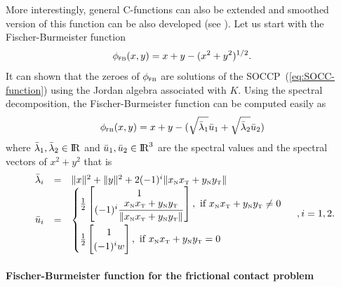 More interestingly,  general C-functions can also be extended and smoothed version of this function can be also developed (see \cite{Fukushima.ea2001}
). Let us start with the Fischer-Burmeister function
\begin{equation}
  \label{eq:Jordan-FB}
  \phi_{\fb}(x,y) = x+y - (x^2 + y^2 )^{1/2}.
\end{equation}
It can shown that the zeroes of $\phi_{{\hbox{\tiny{\textsf FB}}}}$ are solutions of the SOCCP~(\ref{eq:SOCC-function}) using the Jordan algebra associated with $K$. Using the spectral decomposition, the Fischer-Burmeister function can be computed easily as
\begin{equation}
  \label{eq:Jordan-FB-1}
  \phi_{\fb}(x,y) = x+y - (\sqrt{\bar \lambda_1} \bar u_1 + \sqrt{\bar \lambda_2} \bar u_2)
\end{equation}
where $\bar\lambda_1,\bar\lambda_2\in \mathrm{I\!R}$ and $\bar u_1,\bar u_2\in\mathrm{I\!R}^3$ are the spectral values and the spectral vectors of $x^2+y^2$ that is
\begin{equation}
  \label{eq:Jordan-FB-2}
  \begin{array}{rcl}
    \bar \lambda_i&=& \|x\|^2  + \|y\|^2 +   2 (-1)^i\|x_{\n}x_{\t} +y_{\n}y_{\t}\| \\
    \bar u_i &=&
    \begin{cases}
      \frac{1}{2}
      \begin{bmatrix}
        1 \\
        (-1)^i \Frac{x_{\n}x_{\t} +y_{\n}y_{\t}}{\|x_{\n}x_{\t} +y_{\n}y_{\t}\|}
      \end{bmatrix}, \text{ if } x_{\n}x_{\t} +y_{\n}y_{\t}\neq 0 \\[5mm]
       \frac{1}{2}
      \begin{bmatrix}
        1 \\
        (-1)^i w
      \end{bmatrix}, \text{ if } x_{\n}x_{\t} +y_{\n}y_{\t} = 0 \\
    \end{cases}
\end{array}, i = 1,2.
\end{equation}




\paragraph{Fischer-Burmeister function for the frictional contact problem}



